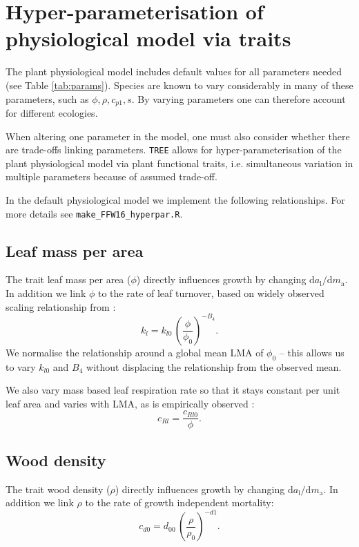 \documentclass[10pt,twoside]{article}
\begin{document}
\section{Hyper-parameterisation of physiological model via
traits}\label{traits}

The plant physiological model includes default values for all parameters needed 
(see Table \ref{tab:params}). Species are known to vary considerably
in many of these parameters, such as $\phi,\rho,c_{p1},s$. By varying  parameters
one can therefore account for different ecologies.

When altering one parameter in the model, one must also consider whether there 
are trade-offs linking parameters. \texttt{TREE} allows for 
hyper-parameterisation of the plant physiological model via plant functional traits, i.e. 
simultaneous variation in multiple parameters because of assumed trade-off.

In the default physiological model we implement the following relationships. For more 
details see \texttt{make\_FFW16\_hyperpar.R}.

\subsection{Leaf mass per area}

The trait leaf mass per area ($\phi$) directly influences growth by changing 
$\textrm{d}a_\textrm{l} / \textrm{d}m_\textrm{a}$. In addition we  
link $\phi$ to the rate of leaf turnover,
based on widely observed scaling relationship from \citet{Wright-2004}:
$$k_l=k_{l0} \, \left(\frac{\phi}{\phi_0}\right)^{-B_4}.$$
We normalise the relationship around a global mean LMA of $\phi_0$ -- this
allows us to vary $k_{l0}$ and $B_4$ without displacing the relationship from the 
observed mean.

We also vary mass based leaf respiration rate so that it stays constant per unit leaf area and
varies with LMA, as is empirically observed \citet{Wright-2004}:
$$c_{Rl}= \frac{c_{Rl0}}{\phi}.$$

\subsection{Wood density}

The trait wood density ($\rho$) directly influences growth by changing 
$\textrm{d}a_\textrm{l} / \textrm{d}m_\textrm{a}$.  In addition we  
link $\rho$ to the rate of growth independent mortality:
$$c_{d0}=d_{00} \, \left(\frac{\rho}{\rho_0}\right) ^ {-d1}.$$
\end{document}
